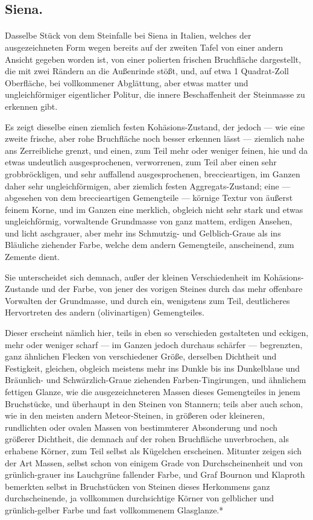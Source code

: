 \documentclass[a4paper, 11pt, oneside, german]{article}
\begin{document}
\subsection{Siena.}
\paragraph{}
Dasselbe Stück von dem Steinfalle bei Siena in Italien, welches der ausgezeichneten Form wegen bereits auf der zweiten Tafel von einer andern Ansicht gegeben worden ist, von einer polierten frischen Bruchfläche dargestellt, die mit zwei Rändern an die Außenrinde stößt, und, auf etwa 1 Quadrat-Zoll Oberfläche, bei vollkommener Abglättung, aber etwas matter und ungleichförmiger eigentlicher Politur, die innere Beschaffenheit der Steinmasse zu erkennen gibt.

Es zeigt dieselbe einen ziemlich festen Kohäsions-Zustand, der jedoch --- wie eine zweite frische, aber rohe Bruchfläche noch besser erkennen lässt --- ziemlich nahe ans Zerreibliche grenzt, und einen, zum Teil mehr oder weniger feinen, hie und da etwas undeutlich ausgesprochenen, verworrenen, zum Teil aber einen sehr grobbröckligen, und sehr auffallend ausgesprochenen, breccieartigen, im Ganzen daher sehr ungleichförmigen, aber ziemlich festen Aggregats-Zustand; eine --- abgesehen von dem breccieartigen Gemengteile --- körnige Textur von äußerst feinem Korne, und im Ganzen eine merklich, obgleich nicht sehr stark und etwas ungleichförmig, vorwaltende Grundmasse von ganz mattem, erdigen Ansehen, und licht aschgrauer, aber mehr ins Schmutzig- und Gelblich-Graue als ins Bläuliche ziehender Farbe, welche dem andern Gemengteile, anscheinend, zum Zemente dient.

Sie unterscheidet sich demnach, außer der kleinen Verschiedenheit im Kohäsions-Zustande und der Farbe, von jener des vorigen Steines durch das mehr offenbare Vorwalten der Grundmasse, und durch ein, wenigstens zum Teil, deutlicheres Hervortreten des andern (olivinartigen) Gemengteiles.

Dieser erscheint nämlich hier, teils in eben so verschieden gestalteten und eckigen, mehr oder weniger scharf --- im Ganzen jedoch durchaus schärfer --- begrenzten, ganz ähnlichen Flecken von verschiedener Größe, derselben Dichtheit und Festigkeit, gleichen, obgleich meistens mehr ins Dunkle bis ins Dunkelblaue und Bräunlich- und Schwärzlich-Graue ziehenden Farben-Tingirungen, und ähnlichem fettigen Glanze, wie die ausgezeichneteren Massen dieses Gemengteiles in jenem Bruchstücke, und überhaupt in den Steinen von Stannern; teils aber auch schon, wie in den meisten andern Meteor-Steinen, in größeren oder kleineren, rundlichten oder ovalen Massen von bestimmterer Absonderung und noch größerer Dichtheit, die demnach auf der rohen Bruchfläche unverbrochen, als erhabene Körner, zum Teil selbst als Kügelchen erscheinen. Mitunter zeigen sich der Art Massen, selbst schon von einigem Grade von Durchscheinenheit und von grünlich-grauer ins Lauchgrüne fallender Farbe, und Graf Bournon und Klaproth bemerkten selbst in Bruchstücken von Steinen dieses Herkommens ganz durchscheinende, ja vollkommen durchsichtige Körner von gelblicher und grünlich-gelber Farbe und fast vollkommenem Glasglanze.*
\end{document}
